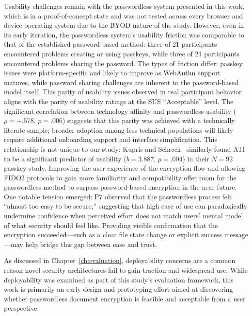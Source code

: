 Usability challenges remain with the passwordless system presented in this work, which is in a proof-of-concept state and was not tested across every browser and device operating system due to the BYOD nature of the study. However, even in its early iteration, the passwordless system's usability friction was comparable to that of the established password-based method: three of 21 participants encountered problems creating or using passkeys, while three of 21 participants encountered problems sharing the password. The types of friction differ: passkey issues were platform-specific and likely to improve as WebAuthn support matures, while password sharing challenges are inherent to the password-based model itself. This parity of usability issues observed in real participant behavior aligns with the parity of usability ratings at the SUS ``Acceptable'' level. The significant correlation between technology affinity and passwordless usability ($\rho=+.578$, $p=.006$) suggests that this parity was achieved with a technically literate sample; broader adoption among less technical populations will likely require additional onboarding support and interface simplification. This relationship is not unique to our study: Kupris and Schreck~\cite{kupris_passkey_2026} similarly found ATI to be a significant predictor of usability ($b=3.887$, $p=.004$) in their $N=92$ passkey study. Improving the user experience of the encryption flow and allowing FIDO2 protocols to gain more familiarity and compatibility offer room for the passwordless method to surpass password-based encryption in the near future. One notable tension emerged: P7 observed that the passwordless process felt ``almost too easy to be secure,'' suggesting that high ease of use can paradoxically undermine confidence when perceived effort does not match users' mental model of what security should feel like. Providing visible confirmation that the encryption succeeded---such as a clear file state change or explicit success message---may help bridge this gap between ease and trust.

As discussed in Chapter~\ref{ch:evaluation}, deployability concerns are a common reason novel security architectures fail to gain traction and widespread use. While deployability was examined as part of this study's evaluation framework, this work is primarily an early design and prototyping effort aimed at discovering whether passwordless document encryption is feasible and acceptable from a user perspective.

